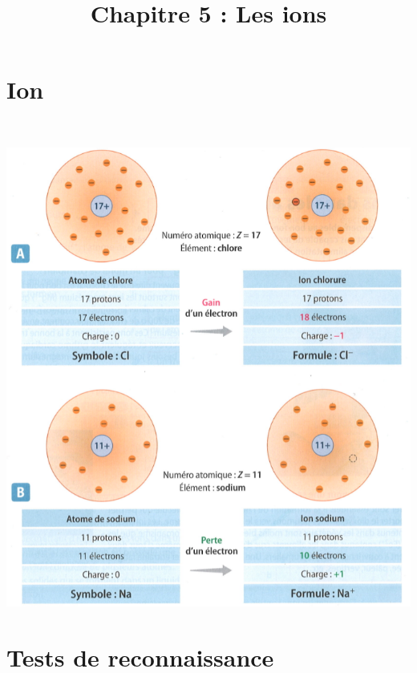 \documentclass[xcolor={dvipsnames}]{beamer}
\title{Chapitre 5 : Les ions}
\begin{document}
\begin{frame}
  \titlepage 
\end{frame}

\section{Ion}

\begin{frame}

\end{frame}

\begin{frame}
%
%
	\
			\begin{center}
				\includegraphics[scale=0.45]{bilan_ions}
			\end{center}
		
%
\end{frame}

\section{Tests de reconnaissance}



\begin{frame}

\end{frame}
\end{document}

